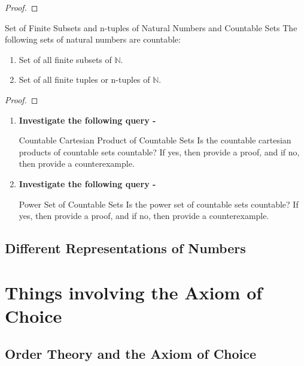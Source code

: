 \begin{proof}
    
\end{proof}
\begin{Theorem}{Set of Finite Subsets and n-tuples of Natural Numbers and Countable Sets}\label{set_of_finite_subsets_and_n-tuples_of_natural_numbers_and_countable_sets}
    The following sets of natural numbers are countable:
    \begin{enumerate}
        \item Set of all finite subsets of $\mathbb{N}$.
        \item Set of all finite tuples or n-tuples of $\mathbb{N}$.
    \end{enumerate}
\end{Theorem}
\begin{proof}
    
\end{proof}
\exercise
\begin{enumerate}[label=\textbf{\arabic*.}]
    \item \textbf{Investigate the following query -}
    \begin{Query}{Countable Cartesian Product of Countable Sets}\label{countable_cartesian_product_of_countable_sets}
        Is the countable cartesian products of countable sets countable? If yes, then provide a proof, and if no, then provide a counterexample.
    \end{Query}
    \item \textbf{Investigate the following query -}
    \begin{Query}{Power Set of Countable Sets}\label{power_set_of_countable_sets}
        Is the power set of countable sets countable? If yes, then provide a proof, and if no, then provide a counterexample.
    \end{Query}
\end{enumerate}
\subsection{Different Representations of Numbers}
\section{Things involving the Axiom of Choice}\label{things_involving_the_AoC}
\subsection{Order Theory and the Axiom of Choice}
